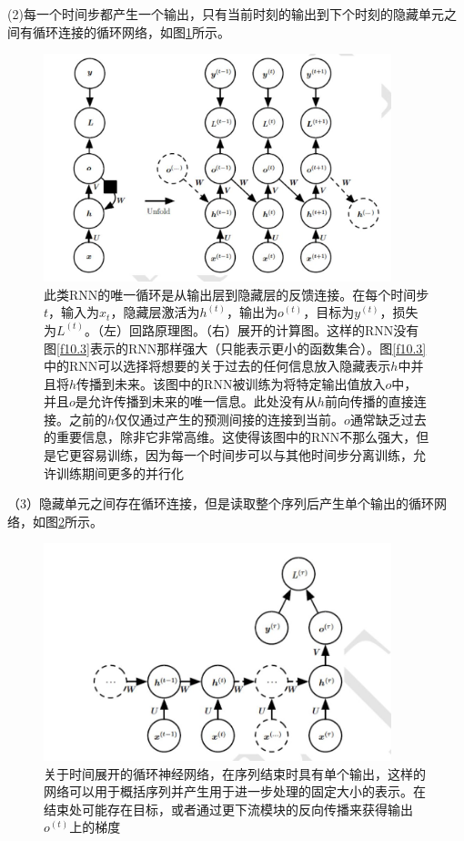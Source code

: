 \documentclass{ctexart}
\begin{document}
        (2)每一个时间步都产生一个输出，只有当前时刻的输出到下个时刻的隐藏单元之间有循环连接的循环网络，如图\ref{f10.4}所示。
        \begin{figure}
            \centering
            \includegraphics[width=0.9\textwidth]{f4}
            \caption{此类RNN的唯一循环是从输出层到隐藏层的反馈连接。在每个时间步$t$，输入为$x_t$，隐藏层激活为$h^{(t)}$，输出为$o^{(t)}$，目标为$y^{(t)}$，损失为$L^{(t)}$。（左）回路原理图。（右）展开的计算图。这样的RNN没有图\ref{f10.3}表示的RNN那样强大（只能表示更小的函数集合）。图\ref{f10.3}中的RNN可以选择将想要的关于过去的任何信息放入隐藏表示$h$中并且将$h$传播到未来。该图中的RNN被训练为将特定输出值放入$o$中，并且$o$是允许传播到未来的唯一信息。此处没有从$h$前向传播的直接连接。之前的$h$仅仅通过产生的预测间接的连接到当前。$o$通常缺乏过去的重要信息，除非它非常高维。这使得该图中的RNN不那么强大，但是它更容易训练，因为每一个时间步可以与其他时间步分离训练，允许训练期间更多的并行化}
            \label{f10.4}
        \end{figure}

        （3）隐藏单元之间存在循环连接，但是读取整个序列后产生单个输出的循环网络，如图\ref{f10.5}所示。
        \begin{figure}
            \centering
            \includegraphics[width=0.9\textwidth]{f5}
            \caption{关于时间展开的循环神经网络，在序列结束时具有单个输出，这样的网络可以用于概括序列并产生用于进一步处理的固定大小的表示。在结束处可能存在目标，或者通过更下流模块的反向传播来获得输出$o^{(t)}$上的梯度}
            \label{f10.5}
        \end{figure}
\end{document}
